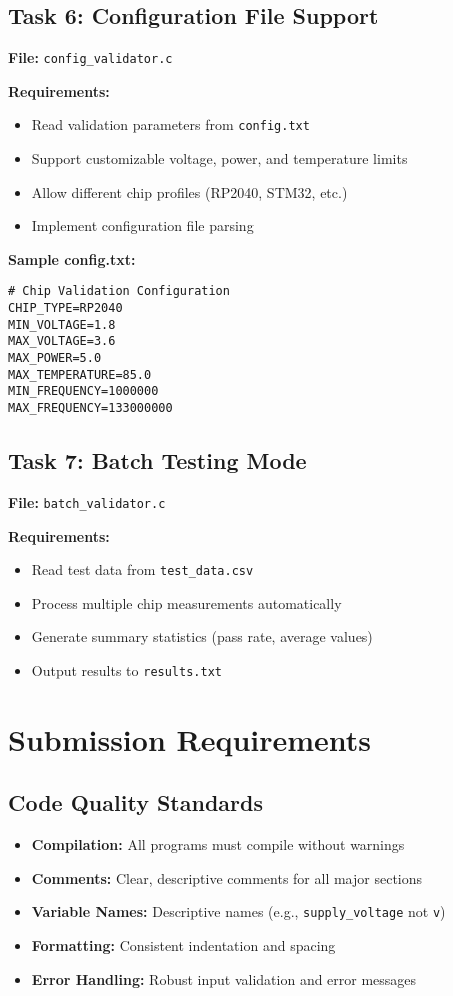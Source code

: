 \documentclass[11pt,a4paper]{article}
\begin{document}
\subsection{Task 6: Configuration File Support}

\textbf{File:} \texttt{config\_validator.c}

\textbf{Requirements:}
\begin{itemize}
    \item Read validation parameters from \texttt{config.txt}
    \item Support customizable voltage, power, and temperature limits
    \item Allow different chip profiles (RP2040, STM32, etc.)
    \item Implement configuration file parsing
\end{itemize}

\textbf{Sample config.txt:}
\begin{verbatim}
# Chip Validation Configuration
CHIP_TYPE=RP2040
MIN_VOLTAGE=1.8
MAX_VOLTAGE=3.6
MAX_POWER=5.0
MAX_TEMPERATURE=85.0
MIN_FREQUENCY=1000000
MAX_FREQUENCY=133000000
\end{verbatim}

\subsection{Task 7: Batch Testing Mode}

\textbf{File:} \texttt{batch\_validator.c}

\textbf{Requirements:}
\begin{itemize}
    \item Read test data from \texttt{test\_data.csv}
    \item Process multiple chip measurements automatically
    \item Generate summary statistics (pass rate, average values)
    \item Output results to \texttt{results.txt}
\end{itemize}

\section{Submission Requirements}

\subsection{Code Quality Standards}
\begin{itemize}
    \item \textbf{Compilation:} All programs must compile without warnings
    \item \textbf{Comments:} Clear, descriptive comments for all major sections
    \item \textbf{Variable Names:} Descriptive names (e.g., \texttt{supply\_voltage} not \texttt{v})
    \item \textbf{Formatting:} Consistent indentation and spacing
    \item \textbf{Error Handling:} Robust input validation and error messages
\end{itemize}
\end{document}
